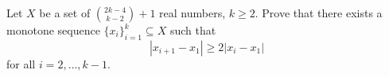 \documentclass{article}
\begin{document}
\setlength{\parindent}{0pt}
Let $X$ be a set of $\binom{2k-4}{k-2}+1$ real numbers, $k\ge2$. Prove that there exists a monotone sequence $\{x_{i}\}_{i=1}^{k}\subseteq X$ such that$$|x_{i+1}-x_{1}|\ge2|x_{i}-x_{1}|$$for all $i=2,\dots,k-1$.
\end{document}
